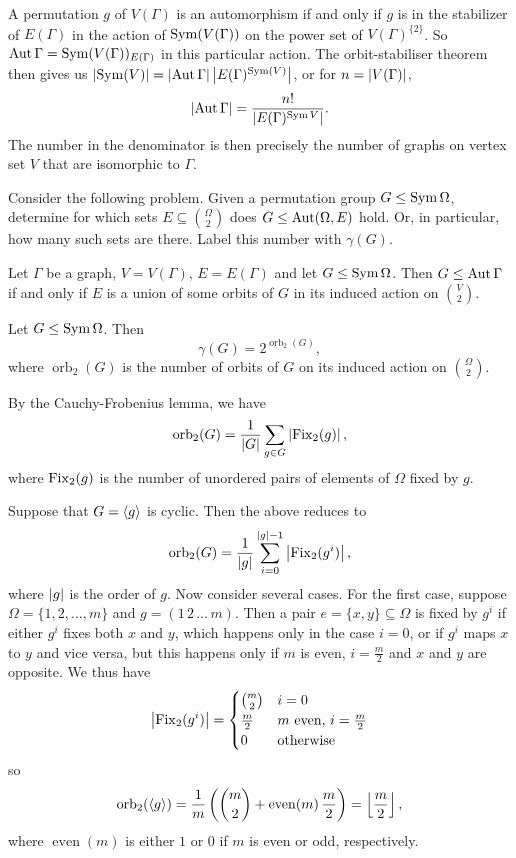 \begin{remark}
  A permutation $g$ of $V(\Gamma)$ is an automorphism if and only if $g$ is in
  the stabilizer of $E(\Gamma)$ in the action of $\operatorname{Sym}(V(\Gamma))$ on the power
  set of $V(\Gamma)^{\{2\}}$.
  So $\operatorname{Aut} \Gamma = \operatorname{Sym}(V(\Gamma))_{E(\Gamma)}$ in this particular action.
  The orbit-stabiliser theorem then gives us $\left| \operatorname{Sym}(V) \right| = \left| \operatorname{Aut} \Gamma \right|
  \left| E(\Gamma)^{\operatorname{Sym}(V)} \right|$, or for $n = \left| V(\Gamma) \right|$,
  \[
	\left| \operatorname{Aut} \Gamma \right| = \frac{n!}{\left| E(\Gamma)^{\operatorname{Sym} V} \right|}.
  \]
  The number in the denominator is then precisely the number of graphs on vertex
  set $V$ that are isomorphic to $\Gamma$.
\end{remark}


Consider the following problem.
Given a permutation group $G \le \operatorname{Sym} \Omega$, determine for which sets $E
\subseteq \binom{\Omega}{2}$ does $G \le \operatorname{Aut} (\Omega, E)$ hold.
Or, in particular, how many such sets are there.
Label this number with $\gamma(G)$.

\begin{lemma}
  Let $\Gamma$ be a graph, $V = V(\Gamma)$, $E = E(\Gamma)$ and let $G \le \operatorname{Sym}
  \Omega$.
  Then $G \le \operatorname{Aut} \Gamma$ if and only if $E$ is a union of some orbits of $G$
  in its induced action on $\binom{V}{2}$.
\end{lemma}

\begin{corollary}
  Let $G \le \operatorname{Sym} \Omega$.
  Then
  \[
	\gamma(G) = 2^{\operatorname{orb}_2(G)},
  \]
  where $\operatorname{orb}_2(G)$ is the number of orbits of $G$ on its induced
  action on $\binom{\Omega}{2}$.
\end{corollary}

By the Cauchy-Frobenius lemma, we have
\[
  \operatorname{orb}_2(G) = \frac{1}{\left| G \right|} \sum_{g \in G} \left| \operatorname{Fix}_2(g) \right|,
\]
where $\operatorname{Fix}_2(g)$ is the number of unordered pairs of elements of $\Omega$ fixed
by $g$.

Suppose that $G = \left< g \right>$ is cyclic.
Then the above reduces to
\[
  \operatorname{orb}_2(G) = \frac{1}{\left| g \right|} \sum_{i=0}^{\left| g \right|-1}
  \left| \operatorname{Fix}_2(g^i) \right|,
\]
where $\left| g \right|$ is the order of $g$.
Now consider several cases.
For the first case, suppose $\Omega = \{1, 2, \ldots, m\}$ and $g =
(1\,2\,\ldots\,m)$.
Then a pair $e = \{x,y\} \subseteq \Omega$ is fixed by $g^i$ if either $g^i$
fixes both $x$ and $y$, which happens only in the case $i=0$, or if $g^i$ maps
$x$ to $y$ and vice versa, but this happens only if $m$ is even, $i =
\frac{m}{2}$ and $x$ and $y$ are opposite.
We thus have
\[
  \left| \operatorname{Fix}_2(g^i) \right| =
  \begin{cases}
	\binom{m}{2} & i = 0 \\
	\frac{m}{2} & \text{$m$ even, $i = \frac{m}{2}$} \\
	0 & \text{otherwise}
  \end{cases}
\]
so
\[
  \operatorname{orb}_2(\left< g \right>)
  = \frac{1}{m} \left(
	\binom{m}{2} + \operatorname{even}(m)\,\frac{m}{2}
  \right)
  = \left\lfloor \frac{m}{2} \right\rfloor,
\]
where $\operatorname{even}(m)$ is either $1$ or $0$ if $m$ is even or odd,
respectively.

